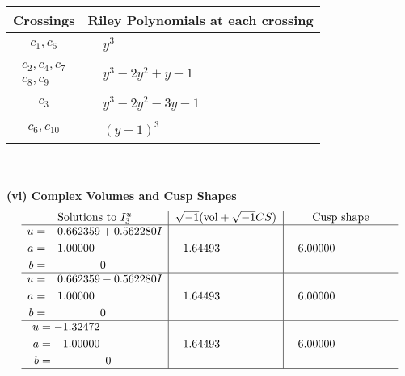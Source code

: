 \documentclass[1p]{elsarticle_modified}
\theoremstyle{definition}
\newcommand{\I}{\sqrt{-1}}
\begin{document}
\begin{tabular}{m{50pt}|m{274pt}}
Crossings & \hspace{64pt}Riley Polynomials at each crossing \\
\hline $$\begin{aligned}c_{1},c_{5}\end{aligned}$$&$\begin{aligned}
&y^3
\end{aligned}$\\
\hline $$\begin{aligned}c_{2},c_{4},c_{7}\\c_{8},c_{9}\end{aligned}$$&$\begin{aligned}
&y^3-2 y^2+y-1
\end{aligned}$\\
\hline $$\begin{aligned}c_{3}\end{aligned}$$&$\begin{aligned}
&y^3-2 y^2-3 y-1
\end{aligned}$\\
\hline $$\begin{aligned}c_{6},c_{10}\end{aligned}$$&$\begin{aligned}
&(y-1)^3
\end{aligned}$\\
\hline
\end{tabular}\\~\\
\newpage\flushleft \textbf{(vi) Complex Volumes and Cusp Shapes}
$$\begin{array}{c|c|c}  
\text{Solutions to }I^u_{3}& \I (\text{vol} + \sqrt{-1}CS) & \text{Cusp shape}\\
 \hline 
\begin{aligned}
u &= \phantom{-}0.662359 + 0.562280 I \\
a &= \phantom{-}1.00000\phantom{ +0.000000I} \\
b &= \phantom{-0.000000 } 0\end{aligned}
 & \phantom{-}1.64493\phantom{ +0.000000I} & \phantom{-}6.00000\phantom{ +0.000000I} \\ \hline\begin{aligned}
u &= \phantom{-}0.662359 - 0.562280 I \\
a &= \phantom{-}1.00000\phantom{ +0.000000I} \\
b &= \phantom{-0.000000 } 0\end{aligned}
 & \phantom{-}1.64493\phantom{ +0.000000I} & \phantom{-}6.00000\phantom{ +0.000000I} \\ \hline\begin{aligned}
u &= -1.32472\phantom{ +0.000000I} \\
a &= \phantom{-}1.00000\phantom{ +0.000000I} \\
b &= \phantom{-0.000000 } 0\end{aligned}
 & \phantom{-}1.64493\phantom{ +0.000000I} & \phantom{-}6.00000\phantom{ +0.000000I}\\
 \hline 
 \end{array}$$\newpage\newpage\renewcommand{\arraystretch}{1}
\end{document}
